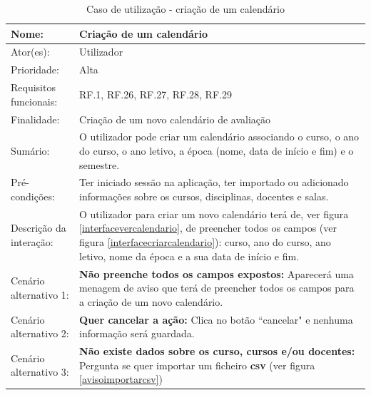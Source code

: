 \documentclass[11pt, twoside]{report}
\begin{document}
\def\arraystretch{1.5}
\begin{table}[H]
	\caption{Caso de utilização - criação de um calendário}
	\label{usecasecriarcalendario}
	\begin{center}	
		\begin{tabularx}{\textwidth}{|l|X|}
			\hline
			\textbf{Nome: }	& \textbf{Criação de um calendário} \\
			\hline
			Ator(es): & Utilizador\\
			\hline
			Prioridade: &  Alta\\
			\hline
			Requisitos funcionais:& RF.1, RF.26, RF.27, RF.28, RF.29\\
			\hline
			Finalidade: & Criação de um novo calendário de avaliação\\
			\hline
			Sumário: & O utilizador pode criar um calendário associando o curso, o ano do curso, o ano letivo, a época (nome, data de início e fim) e o semestre.\\
			\hline
			Pré-condições: & Ter iniciado sessão na aplicação, ter importado ou adicionado informações sobre os cursos, disciplinas, docentes e salas.\\
			\hline
			Descrição da interação: & O utilizador para criar um novo calendário terá de, ver figura \ref{interfacevercalendario}, de preencher todos os campos (ver figura \ref{interfacecriarcalendario}): curso, ano do curso, ano letivo, nome da época e a sua data de início e fim.  \\
			\hline
			Cenário alternativo 1: &\textbf{Não preenche todos os campos  expostos:} Aparecerá uma menagem de aviso que terá de preencher todos os campos para a criação de um novo calendário.\\
			\hline
			Cenário alternativo 2: &\textbf{Quer cancelar a ação:} Clica no botão ``cancelar" e nenhuma informação será guardada.\\
			\hline
			Cenário alternativo 3: &\textbf{Não existe dados sobre os curso, cursos e/ou docentes:} Pergunta se quer importar um ficheiro \textbf{csv} (ver figura \ref{avisoimportarcsv})\\
			\hline
		\end{tabularx}
	\end{center}
\end{table}
\end{document}
